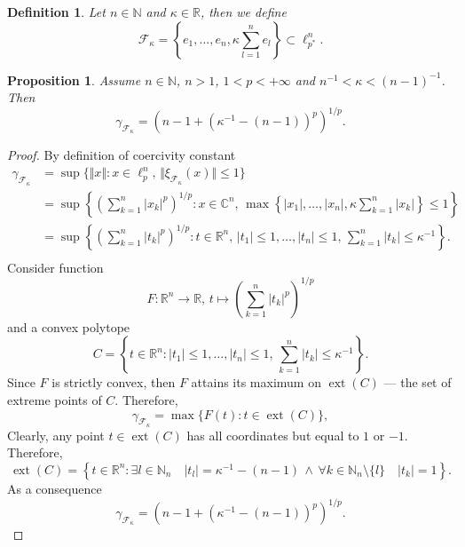 \documentclass[12pt]{article}
\newtheorem{proposition}[theorem]{Proposition}
\newtheorem{definition}[theorem]{Definition}
\begin{document}
\begin{definition}\label{SpclFuncFam}
    Let $n\in\mathbb{N}$ and $\kappa\in\mathbb{R}$, then we define 
    \[
        \mathcal{F}_{\kappa}
        =\left\{e_1,\ldots,e_n,\kappa \sum_{l=1}^n e_l\right\}
        \subset \ell_{p^*}^{n}.
    \]
\end{definition}

\begin{proposition}\label{StdEmbdSpclCoerciv}
    Assume $n\in\mathbb{N}$, $n>1$, $1<p<+\infty$ 
    and $n^{-1}<\kappa<(n-1)^{-1}$. Then
    \[
        \gamma_{\mathcal{F}_{\kappa}}=(n-1+(\kappa^{-1}-(n-1))^p)^{1/p}.
    \]
\end{proposition}
\begin{proof}
    By definition of coercivity constant
    \[
    \begin{aligned}
        \gamma_{\mathcal{F}_{\kappa}}
        &=\sup\{
            \Vert x\Vert : 
            x\in\ell_{p}^n,\, \Vert \xi_{\mathcal{F}_{\kappa}}(x)\Vert\leq 1
        \} \\
        &=\sup\left\{
            \left( \sum_{k=1}^n |x_k|^p\right)^{1/p} : 
            x\in\mathbb{C}^n,\, 
            \max\left\{|x_1|,\ldots,|x_n|,\kappa\sum_{k=1}^n |x_k|\right\}\leq 1
        \right\} \\
        &=\sup\left\{
            \left( \sum_{k=1}^n |t_k|^p\right)^{1/p} : 
            t\in\mathbb{R}^n,\, 
            |t_1|\leq 1,\ldots,|t_n|\leq 1,\,\sum_{k=1}^n |t_k|\leq \kappa^{-1}
        \right\}. \\
    \end{aligned}
    \]
    Consider function
    \[
        F:
        \mathbb{R}^n\to\mathbb{R},\, 
        t\mapsto \left(\sum_{k=1}^n|t_k|^p\right)^{1/p}
    \]
    and a convex polytope
    \[
        C=\left\{ 
            t\in\mathbb{R}^n : 
            |t_1|\leq 1,\ldots,|t_n|\leq 1,\,\sum_{k=1}^n |t_k|\leq \kappa^{-1}
        \right\}.
    \]
    Since $F$ is strictly convex, then $F$ attains its maximum 
    on $\operatorname{ext}(C)$ --- the set of extreme points of $C$. Therefore,
    \[
        \gamma_{\mathcal{F}_{\kappa}}=\max\{F(t):t\in\operatorname{ext}(C)\},
    \]
    Clearly, any point $t\in \operatorname{ext}(C)$ has all coordinates but 
    equal to $1$ or $-1$. Therefore,
    \[
        \operatorname{ext}(C)=\left\{ 
            t\in\mathbb{R}^n : 
            \exists l\in\mathbb{N}_n\quad |t_l|=\kappa^{-1}-(n-1)\,\wedge\, 
            \forall k\in\mathbb{N}_n\setminus\{l\}\quad |t_k|=1
        \right\}.
    \]
    As a consequence
    \[
        \gamma_{\mathcal{F}_{\kappa}}=(n-1+(\kappa^{-1}-(n-1))^p)^{1/p}.
    \]
\end{proof}
\end{document}
